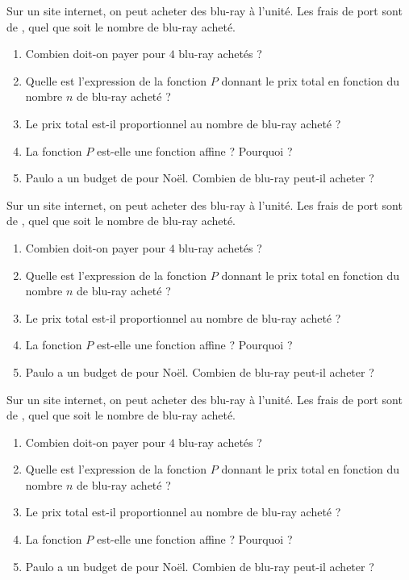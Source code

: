 \documentclass[10pt,openright,twoside,french]{book}
\begin{document}
Sur un site internet, on peut acheter des blu-ray à  l'unité. Les frais de port sont de , quel que soit le nombre de blu-ray acheté.
\begin{enumerate}
    \item Combien doit-on payer pour $4$ blu-ray achetés ?
    \item Quelle est l'expression de la fonction $P$ donnant le prix total en fonction du nombre $n$ de blu-ray acheté ?
    \item Le prix total est-il proportionnel au nombre de blu-ray acheté ?
    \item La fonction $P$ est-elle une fonction affine ? Pourquoi ?
    \item Paulo a un budget de  pour Noël. Combien de blu-ray peut-il acheter ?
\end{enumerate}\bigskip

\hrulefill\bigskip

Sur un site internet, on peut acheter des blu-ray à  l'unité. Les frais de port sont de , quel que soit le nombre de blu-ray acheté.
\begin{enumerate}
    \item Combien doit-on payer pour $4$ blu-ray achetés ?
    \item Quelle est l'expression de la fonction $P$ donnant le prix total en fonction du nombre $n$ de blu-ray acheté ?
    \item Le prix total est-il proportionnel au nombre de blu-ray acheté ?
    \item La fonction $P$ est-elle une fonction affine ? Pourquoi ?
    \item Paulo a un budget de  pour Noël. Combien de blu-ray peut-il acheter ?
\end{enumerate}\bigskip

\hrulefill\bigskip

Sur un site internet, on peut acheter des blu-ray à  l'unité. Les frais de port sont de , quel que soit le nombre de blu-ray acheté.
\begin{enumerate}
    \item Combien doit-on payer pour $4$ blu-ray achetés ?
    \item Quelle est l'expression de la fonction $P$ donnant le prix total en fonction du nombre $n$ de blu-ray acheté ?
    \item Le prix total est-il proportionnel au nombre de blu-ray acheté ?
    \item La fonction $P$ est-elle une fonction affine ? Pourquoi ?
    \item Paulo a un budget de  pour Noël. Combien de blu-ray peut-il acheter ?
\end{enumerate}\bigskip
\end{document}
